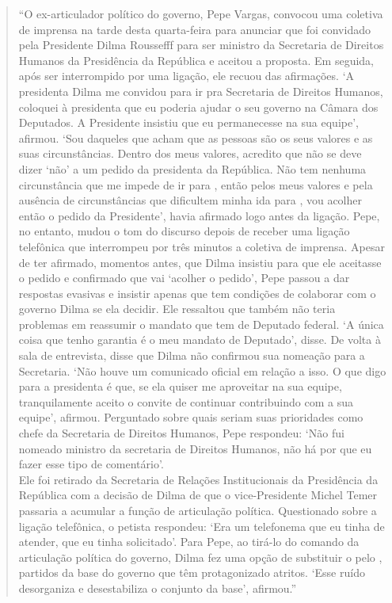 \asterisc



\begin{quote}
``O ex-articulador político do governo, Pepe Vargas, convocou uma
coletiva de imprensa na tarde desta quarta-feira para anunciar que foi
convidado pela Presidente Dilma Roussefff para ser ministro da
Secretaria de Direitos Humanos da Presidência da República e aceitou a
proposta. Em seguida, após ser interrompido por uma ligação, ele recuou
das afirmações. `A presidenta Dilma me convidou para ir pra Secretaria
de Direitos Humanos, coloquei à presidenta que eu poderia ajudar o seu
governo na Câmara dos Deputados. A Presidente insistiu que eu
permanecesse na sua equipe', afirmou. `Sou daqueles que acham que as
pessoas são os seus valores e as suas circunstâncias. Dentro dos meus
valores, acredito que não se deve dizer `não' a um pedido da presidenta
da República. Não tem nenhuma circunstância que me impede de ir para
, então pelos meus valores e pela ausência de circunstâncias que
dificultem minha ida para , vou acolher então o pedido da
Presidente', havia afirmado logo antes da ligação. Pepe, no entanto,
mudou o tom do discurso depois de receber uma ligação telefônica que
interrompeu por três minutos a coletiva de imprensa. Apesar de ter
afirmado, momentos antes, que Dilma insistiu para que ele aceitasse o
pedido e confirmado que vai `acolher o pedido', Pepe passou a dar
respostas evasivas e insistir apenas que tem condições de colaborar com
o governo Dilma se ela decidir. Ele ressaltou que também não teria
problemas em reassumir o mandato que tem de Deputado federal. `A única
coisa que tenho garantia é o meu mandato de Deputado', disse. De volta à
sala de entrevista, disse que Dilma não confirmou sua nomeação para a
Secretaria. `Não houve um comunicado oficial em relação a isso. O que
digo para a presidenta é que, se ela quiser me aproveitar na sua equipe,
tranquilamente aceito o convite de continuar contribuindo com a sua
equipe', afirmou. Perguntado sobre quais seriam suas prioridades como
chefe da Secretaria de Direitos Humanos, Pepe respondeu: `Não fui
nomeado ministro da secretaria de Direitos Humanos, não há por que eu
fazer esse tipo de comentário'.\\Ele foi retirado da Secretaria de
Relações Institucionais da Presidência da República com a decisão de
Dilma de que o vice-Presidente Michel Temer passaria a acumular a função
de articulação política. Questionado sobre a ligação telefônica, o
petista respondeu: `Era um telefonema que eu tinha de atender, que eu
tinha solicitado'. Para Pepe, ao tirá-lo do comando da articulação
política do governo, Dilma fez uma opção de substituir o  pelo ,
partidos da base do governo que têm protagonizado atritos. `Esse ruído
desorganiza e desestabiliza o conjunto da base', afirmou.''
\end{quote}


